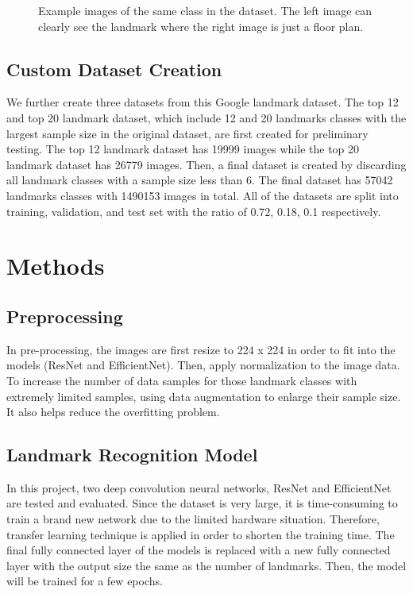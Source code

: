 \documentclass[10pt,twocolumn,letterpaper]{article}
\begin{document}
\begin{figure}[!htb]
\begin{minipage}[t]{0.23\textwidth}
    \end{minipage}
    \caption{Example images of the same class in the dataset. The left image can clearly see the landmark where the right image is just a floor plan.}
    \label{fig:landmark_example}
\end{figure}

\subsection{Custom Dataset Creation}
We further create three datasets from this Google landmark dataset. The top 12 and top 20 landmark dataset, which include 12 and 20 landmarks classes with the largest sample size in the original dataset, are first created for preliminary testing. The top 12 landmark dataset has 19999 images while the top 20 landmark dataset has 26779 images. Then, a final dataset is created by discarding all landmark classes with a sample size less than 6. The final dataset has 57042 landmarks classes with 1490153 images in total. All of the datasets are split into training, validation, and test set with the ratio of 0.72, 0.18, 0.1 respectively.

\section{Methods}
\subsection{Preprocessing}
In pre-processing, the images are first resize to 224 x 224 in order to fit into the models (ResNet and EfficientNet). Then, apply normalization to the image data. 
To increase the number of data samples for those landmark classes with extremely limited samples, using data augmentation to enlarge their sample size. It also helps reduce the overfitting problem.


\subsection{Landmark Recognition Model}
In this project, two deep convolution neural networks, ResNet and EfficientNet are tested and evaluated. Since the dataset is very large, it is time-consuming to train a brand new network due to the limited hardware situation. Therefore, transfer learning technique is applied in order to shorten the training time. The final fully connected layer of the models is replaced with a new fully connected layer with the output size the same as the number of landmarks. Then, the model will be trained for a few epochs.
\end{document}
